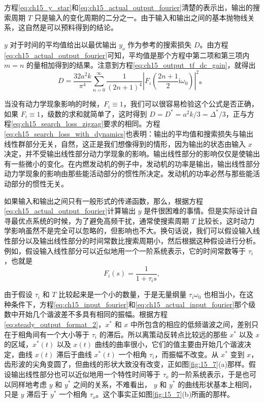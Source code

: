 方程\eqref{eq:ch15_y_star}和\eqref{eq:ch15_actual_output_fourier}清楚的表示出，输出的搜索周期 $T$ 只是输入的变化周期的二分之一。由于输入和输出之间的基本抛物线关系，这自然是可以预料得到的结论。

$y$ 对于时间的平均值给出以最优输出 $y_o$ 作为参考的搜索损失 $D$。由方程\eqref{eq:ch15_actual_output_fourier}可知，平均值是那个方程中第二项和第三项内 $m=n$ 的量相加得到的结果。注意到方程\eqref{eq:ch15_output_tf_dc_gain}，就得出
\begin{equation}
D = \frac{32a^2k}{\pi^4}\sum_{n=0}^\infty \frac{1}{(2n+1)^4}\left|F_i\left(\frac{2n+1}{2}\mathrm{i}\omega_0\right)\right|^2。
\label{eq:ch15_search_loss_with_dynamics}
\end{equation}

当没有动力学现象影响的时候，$F_i\equiv1$，我们可以很容易检验这个公式是否正确，如果 $F_i\equiv1$，级数的求和就简单了，这时得到 $D=D^*=a^2k/3=\Delta^*/3$，正与方程\eqref{eq:ch15_search_loss_zigzag}要求的相同。方程\eqref{eq:ch15_search_loss_with_dynamics}也表明：输出的平均值和搜索损失与输出线性群部分无关，自然，这正是我们想像得到的情形，因为输出的状态由输入 $x$ 决定，并不受输出线性部分动力学现象的影响。输出线性部分的影响仅仅是使输出有一些微小的变化。在内燃发动机的例子中，发动机的功率是输出，输出线性部分动力学现象的影响由那些能活动部分的惯性所决定。发动机的功率必然与那些能活动部分的惯性无关。

如果输入和输出之间只有一般形式的传递函数，那么，根据方程\eqref{eq:ch15_actual_output_fourier}计算输出 $y$ 是件很困难的事情。但是实际设计自寻最优点系统的时候，为了避免高频干扰，通常使搜索周期 $T$ 比较长，这时动力学影响虽然不是完全可以忽略的，但影响也不大。换句话说，我们可以假设输入线性部分以及输出线性部分的时间常数比搜索周期小，然后根据这种假设进行分析。例如，假设输入线性部分可以近似地用一个一阶系统表示，它的时间常数等于 $\tau_i$，也就是
\begin{equation}
F_i(s) = \frac{1}{1+\tau_i s},
\label{eq:ch15_input_tf_first_order}
\end{equation}

由于假设 $\tau_i$ 和 $T$ 比较起来是一个小的数量，于是无量纲量 $\tau_i\omega_0$ 也相当小，在这种条件下，方程\eqref{eq:ch15_input_fourier}和\eqref{eq:ch15_actual_input_fourier}那个级数中开始几个谐波差不多具有相同的振幅。根据方程\eqref{eq:steady_output_format_2}，$x^*$ 和 $x$ 中所包含的相应的低频谐波之间，差别只在于相角间有一个大小等于 $\tau_i$ 的滞后。所以离策动反转点比较远的那些 $x^*$ 以及 $x$ 的区域，$x^*(t)$ 以及 $x(t)$ 曲线的曲率很小，它们的值主要由开始几个谐波决定，曲线 $x(t)$ 滞后于曲线 $x^*(t)$ 一个相角 $\tau_i$，而振幅不改变。从 $x^*$ 变到 $x$，齿形波的尖角变圆了，但曲线的形状大致没有改变，正如图\ref{fig:15_7}(a)那样。假设输出线性部分也可以近似地用一个特性时间等于 $\tau_o$ 的一阶系统表示，于是也可以同样地考虑 $y$ 和 $y^*$ 之间的关系，不难看出， $y$ 和 $y^*$ 的曲线形状基本上相同，只是 $y$ 滞后于 $y^*$ 一个相角 $\tau_o$。这个事实正如图\ref{fig:15_7}(b)所画的那样。

